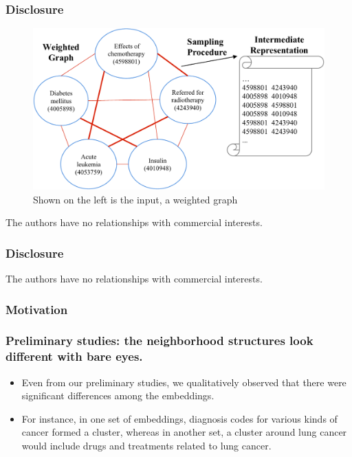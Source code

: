 \documentclass{beamer}
\begin{document}
\begin{frame}
\frametitle{Disclosure}
\begin{figure}[t]
    \centering 
    \includegraphics[width=.6\linewidth]{figs/Figure1-transform.pdf}
    \caption{ \footnotesize Shown on the left is the input, a weighted graph 
\label{fig:weighted_graph_viz}}
\end{figure}

\begin{center}

The authors have no relationships 
with commercial interests.
\end{center}
\end{frame}
\begin{frame}
\frametitle{Disclosure}
\begin{center}
The authors have no relationships 
with commercial interests.
\end{center}
\end{frame}
\begin{frame}
\frametitle{Motivation}
\end{frame}
\begin{frame}
\frametitle{Preliminary studies: the neighborhood
structures look different with bare eyes.}
\begin{itemize}
\item
Even from our preliminary studies,
we qualitatively observed that there were significant differences among
the embeddings.

\bigskip

\item For instance, in one set of embeddings, diagnosis
codes for various kinds of cancer formed a cluster, whereas in another set, a cluster
around lung cancer would include drugs and treatments related to lung cancer.

\end{itemize}
\end{frame}
\end{document}
